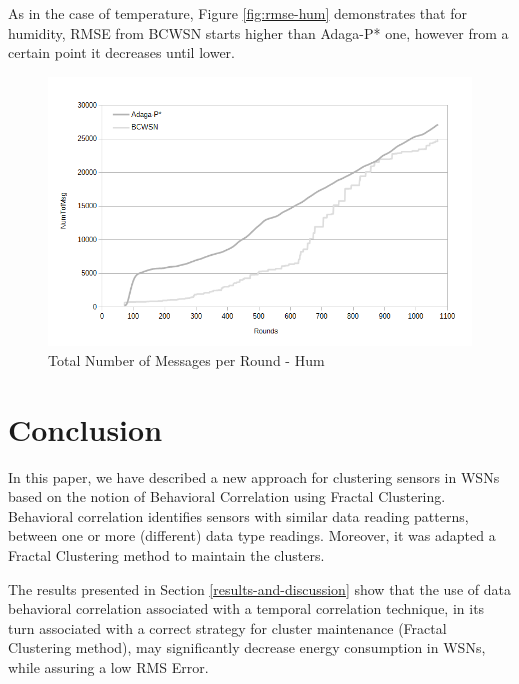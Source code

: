 \documentclass{acm_proc_article-sp}
\begin{document}
As in the case of temperature, Figure \ref{fig:rmse-hum} demonstrates that for 
humidity, RMSE from BCWSN starts higher than Adaga-P* one, however from a certain 
point it decreases until lower.
\vspace*{-.3cm}

\begin{figure}[!htb]
\begin{center}
	\includegraphics[scale=0.33]{BCWSN-TotNumMsgxRound-PB-2Appr-Hum.png}
    \caption{Total Number of Messages per Round - Hum}
    \label{fig:tot-num-msg-hum}
\end{center}
\end{figure}
\vspace*{-.3cm}

\section{Conclusion}
\label{conclusion}

In this paper, we have described a new approach for clustering sensors in WSNs
based on the notion of Behavioral Correlation using Fractal Clustering.
Behavioral correlation identifies sensors with similar data reading patterns,
between one or more (different) data type readings. Moreover, it was adapted a
Fractal Clustering method to maintain the clusters.
\vspace*{-.3cm}

The results presented in Section \ref{results-and-discussion} show that the use
of data behavioral correlation associated with a temporal correlation technique,
in its turn associated with a correct strategy for cluster maintenance (Fractal
Clustering method), may significantly decrease energy consumption in WSNs, while
assuring a low RMS Error.
\vspace*{-.3cm}
\end{document}
